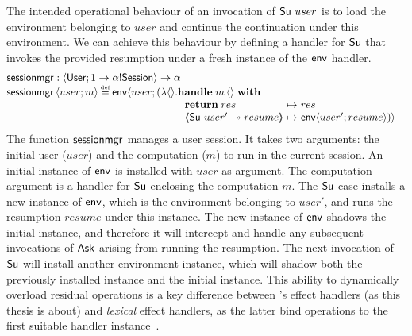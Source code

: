 \documentclass[12pt,phd,lfcs,twoside,openright,logo,leftchapter,normalheadings]{infthesis}
\theoremstyle{plain}
\theoremstyle{definition}
\begin{document}
The intended operational behaviour of an invocation of $\mathsf{Su}~user$ is
to load the environment belonging to $user$ and continue the
continuation under this environment.
%
We can achieve this behaviour by defining a handler for $\mathsf{Su}$ that
invokes the provided resumption under a fresh instance of the
$\mathsf{env}$ handler.
%
\[
  \bl
    \sessionmgr : \Record{\User; \UnitType \to \alpha \eff \EnvE} \to \alpha\\
    \sessionmgr\,\Record{user;m} \defas
      \environment\langle{}user;(\lambda\Unit.
         \ba[t]{@{}l}
           \Handle\;m\,\Unit\;\With\\
             ~\ba{@{~}l@{~}c@{~}l}
                \Return\;res &\mapsto& res\\
                \OpCase{\Su}{user'}{resume} &\mapsto& \environment\Record{user';resume})\rangle
              \ea
         \ea
  \el
\]
%
The function $\mathsf{sessionmgr}$ manages a user session. It takes two
arguments: the initial user ($user$) and the computation ($m$) to run
in the current session. An initial instance of $\mathsf{env}$ is
installed with $user$ as argument. The computation argument is a
handler for $\mathsf{Su}$ enclosing the computation $m$. The $\mathsf{Su}$-case
installs a new instance of $\mathsf{env}$, which is the environment
belonging to $user'$, and runs the resumption $resume$ under this
instance.
%
The new instance of $\mathsf{env}$ shadows the initial instance, and
therefore it will intercept and handle any subsequent invocations of
$\mathsf{Ask}$ arising from running the resumption. The next invocation of
$\mathsf{Su}$ will install another environment instance, which will shadow
both the previously installed instance and the initial instance. This
ability to dynamically overload residual operations is a key
difference between \citeauthor{PlotkinP09}'s effect handlers (as this
thesis is about) and \emph{lexical} effect handlers, as the latter
bind operations to the first suitable handler
instance~\cite{XieBHSL20,BrachthauserSO20}.
%
\end{document}
